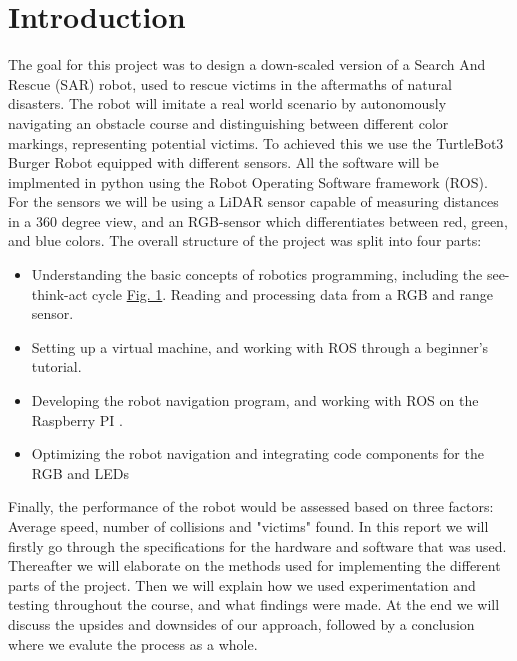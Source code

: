 \documentclass[conference]{IEEEtran}
\begin{document}
\section{Introduction}
The goal for this project was to design a down-scaled version of a Search And Rescue (SAR) robot, used to rescue victims in the aftermaths of natural disasters.
The robot will imitate a real world scenario by autonomously navigating an obstacle course and distinguishing between different color markings, representing potential victims. To achieved this we use the TurtleBot3 Burger Robot equipped with different sensors.
All the software will be implmented in python using the Robot Operating Software framework (ROS). For the sensors we will be using a LiDAR sensor capable of measuring distances in a 360 degree view, and an RGB-sensor which differentiates between red, green, and blue colors. 
The overall structure of the project was split into four parts:
\begin{itemize}
    \item Understanding the basic concepts of robotics programming, including the see-think-act cycle \href{sec:STAC}{Fig. 1}. Reading and processing data from a RGB and range sensor.
    \item Setting up a virtual machine, and working with ROS through a beginner's tutorial.
    \item Developing the robot navigation program, and working with ROS on the Raspberry PI .
    \item Optimizing the robot navigation and integrating code components for the RGB and LEDs
\end{itemize} 
Finally, the performance of the robot would be assessed based on three factors: Average speed, number of collisions and "victims" found.
In this report we will firstly go through the specifications for the hardware and software that was used.
Thereafter we will elaborate on the methods used for implementing the different parts of the project.
Then we will explain how we used experimentation and testing throughout the course, and what findings were made.
At the end we will discuss the upsides and downsides of our approach, followed by a conclusion where we evalute the process as a whole.
\end{document}
